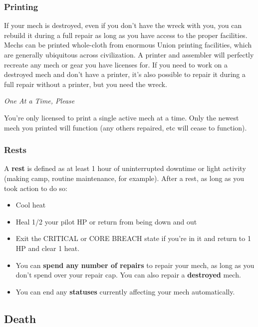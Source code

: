 \subsubsection{Printing}

If your mech is destroyed, even if you don't have the wreck with you, you can rebuild it during a full repair as long as you have access to the proper facilities. Mechs can be printed whole-cloth from enormous Union printing facilities, which are generally ubiquitous across civilization. A printer and assembler will perfectly recreate any mech or gear you have licenses for. If you need to work on a destroyed mech and don't have a printer, it's also possible to repair it during a full repair without a printer, but you need the wreck. 

\begin{center}
  \textit{One At a Time, Please}
\end{center}

You're only licensed to print a single active mech at a time. Only the newest mech you printed will function (any others repaired, etc will cease to function).

\subsubsection{Rests}

A \textbf{rest} is defined as at least 1 hour of uninterrupted downtime or light activity (making camp, routine maintenance, for example). After a rest, as long as you took action to do so: 
\begin{itemize}
\item Cool heat
\item Heal 1/2 your pilot HP or return from being down and out 
\item Exit the CRITICAL or CORE BREACH state if you're in it and return to 1 HP and clear 1 heat.
\item You can \textbf{spend any number of repairs} to repair your mech, as long as you don't spend over your repair cap. You can also repair a \textbf{destroyed} mech.
\item You can end any \textbf{statuses} currently affecting your mech automatically.
\end{itemize}

\subsection{Death}

